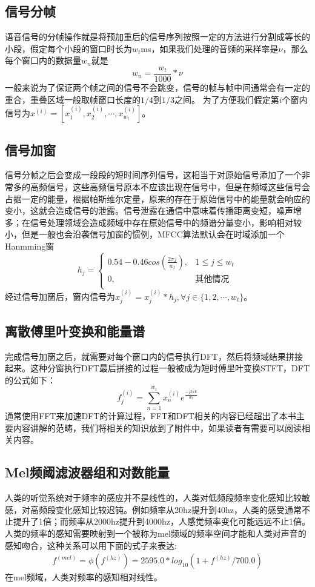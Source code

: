 \documentclass[twoside,a4paper,12pt]{book}%
\begin{document}
\subsection{信号分帧}
语音信号的分帧操作就是将预加重后的信号序列按照一定的方法进行分割成等长的小段，假定每个小段的窗口时长为$w_t$ms，如果我们处理的音频的采样率是$\nu$，那么每个窗口内的数据量$w_n$就是
$$
w_n = \frac{w_t}{1000}*\nu
$$
一般来说为了保证两个帧之间的信号不会跳变，信号的帧与帧中间通常会有一定的重合，重叠区域一般取帧窗口长度的$1/4$到$1/3$之间。
为了方便我们假定第$i$个窗内信号为$x^{(i)}=[x^{(i)}_1,x^{(i)}_2,\cdots,x^{(i)}_{w_t}]$。

\subsection{信号加窗}
信号分帧之后会变成一段段的短时间序列信号，这相当于对原始信号添加了一个非常多的高频信号，这些高频信号原本不应该出现在信号中，但是在频域这些信号会占据一定的能量，根据帕斯维尔定量，原来的存在于原始信号中的能量就会响应的变小，这就会造成信号的泄露。信号泄露在通信中意味着传播距离变短，噪声增多；在信号处理领域会造成频域中存在原始信号中的频谱分量变小，影响相对较小，但是一般也会沿袭信号加窗的惯例，MFCC算法默认会在时域添加一个Hanmming窗
$$
h_j  =\left\{  
             \begin{array}{ll}  
             0.54-0.46cos(\frac{2 \pi j}{w_t}), & 1 \le j \le w_t \\  
             0, & \text{其他情况} \\   
             \end{array}  
\right .  
$$
经过信号加窗后，窗内信号为$x^{(i)}_j=x^{(i)}_j*h_j, \forall j \in \{1,2,\cdots,w_t\}$。
\subsection{离散傅里叶变换和能量谱}
完成信号加窗之后，就需要对每个窗口内的信号执行DFT，然后将频域结果拼接起来。这种分窗执行DFT最后拼接的过程一般被成为短时傅里叶变换STFT，DFT的公式如下：
$$
f^{(i)}_j = \sum_{n=1}^{w_t}{x^{(i)}_ne^{\frac{-j2\pi k}{w_t}}}
$$
通常使用FFT来加速DFT的计算过程，FFT和DFT相关的内容已经超出了本书主要内容讲解的范畴，我们将相关的知识放到了附件中，如果读者有需要可以阅读相关内容。

\subsection{ Mel频阈滤波器组和对数能量}
人类的听觉系统对于频率的感应并不是线性的，人类对低频段频率变化感知比较敏感，对高频段变化感知比较迟钝。例如频率从20hz提升到40hz，人类的感受通常不止提升了1倍；而频率从2000hz提升到4000hz，人感觉频率变化可能远远不止1倍。人类的频率的感知需要映射到一个被称为mel频域的频率空间才能和人类对声音的感知吻合，这种关系可以用下面的式子来表达:
$$
\begin{array}{c}  
f^{(mel)}= \phi(f^{(hz)})= 2595.0*log_{10}(1+f^{(hz)}/700.0)
\end{array}    
$$
在mel频域，人类对频率的感知相对线性。
\end{document}
